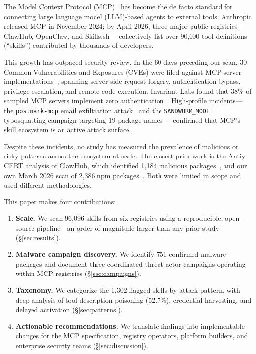 \documentclass[letterpaper,twocolumn,10pt]{article}
\begin{document}
The Model Context Protocol (MCP)~\cite{mcp2024} has become the de facto
standard for connecting large language model (LLM)-based agents to
external tools.  Anthropic released MCP in November 2024; by April 2026,
three major public registries---ClawHub, OpenClaw, and Skills.sh---
collectively list over 90,000 tool definitions (``skills'') contributed
by thousands of developers.

This growth has outpaced security review.  In the 60 days preceding our
scan, 30 Common Vulnerabilities and Exposures (CVEs) were filed against
MCP server implementations~\cite{cve6514,cve53773,cve68143,cve68144,
cve68145,cve49596,cve59536}, spanning server-side request forgery,
authentication bypass, privilege escalation, and remote code execution.
Invariant Labs found that 38\% of sampled MCP servers implement zero
authentication~\cite{invariant2025}.  High-profile incidents---the
\texttt{postmark-mcp} email exfiltration attack~\cite{postmark} and the
\texttt{SANDWORM\_MODE} typosquatting campaign targeting 19 package
names~\cite{sandworm}---confirmed that MCP's skill ecosystem is an
active attack surface.

Despite these incidents, no study has measured the prevalence of
malicious or risky patterns across the ecosystem at scale.  The closest
prior work is the Antiy CERT analysis of ClawHub, which identified 1,184
malicious packages~\cite{antiy2026}, and our own March 2026 scan of
2,386 npm packages~\cite{atrscan2386}.  Both were limited in scope and
used different methodologies.

This paper makes four contributions:

\begin{enumerate}[leftmargin=*,nosep]
  \item \textbf{Scale.}  We scan 96,096 skills from six registries
    using a reproducible, open-source pipeline---an order of magnitude
    larger than any prior study (\S\ref{sec:results}).
  \item \textbf{Malware campaign discovery.}  We identify 751 confirmed
    malware packages and document three coordinated threat actor
    campaigns operating within MCP registries
    (\S\ref{sec:campaigns}).
  \item \textbf{Taxonomy.}  We categorize the 1,302 flagged skills by
    attack pattern, with deep analysis of tool description poisoning
    (52.7\%), credential harvesting, and delayed activation
    (\S\ref{sec:patterns}).
  \item \textbf{Actionable recommendations.}  We translate findings into
    implementable changes for the MCP specification, registry operators,
    platform builders, and enterprise security teams
    (\S\ref{sec:discussion}).
\end{enumerate}
\end{document}
